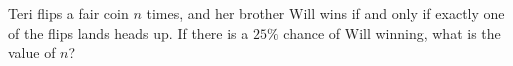 Teri flips a fair coin $n$ times, and her brother Will wins if and only if exactly one of the flips lands heads up. If there is a $25\%$ chance of Will winning, what is the value of $n$?

